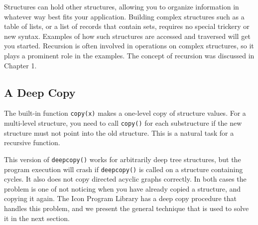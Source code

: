Structures can hold other structures, allowing you to
organize information in whatever way best fits your application.
Building complex structures such as a table of lists, or a list
of records that contain sets, requires no special trickery or new
syntax. Examples of how such structures are accessed and
traversed will get you started. Recursion is often
involved in operations on complex structures, so it plays a prominent
role in the examples. The concept of recursion was discussed in Chapter
1.

\subsection{A Deep Copy}

The built-in function \texttt{copy(x)} makes a one-level
copy of structure values. For a multi-level structure, you need to call
\texttt{copy()} for each substructure if the new structure must not
point into the old structure. This is a natural task for
a recursive function.


This version of \texttt{deepcopy()} works for
arbitrarily deep tree structures, but the program execution
will crash if \texttt{deepcopy()} is called on a structure containing
cycles. It also does not copy directed acyclic graphs correctly. In
both cases the problem is one of not noticing when you have already
copied a structure, and copying it again. The Icon Program Library has
a deep copy procedure that handles this problem, and we present the
general technique that is used to solve it in the next section.

